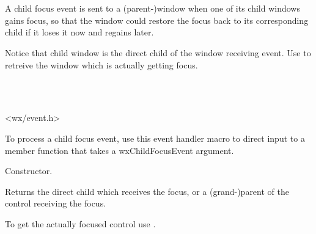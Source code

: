 \section{}\label{wxchildfocusevent}

A child focus event is sent to a (parent-)window when one of its child windows gains focus,
so that the window could restore the focus back to its corresponding child
if it loses it now and regains later.

Notice that child window is the direct child of the window receiving event.
Use  to retreive the window which is actually getting focus. 


\\
\\


<wx/event.h>




To process a child focus event, use this event handler macro to direct input to a member
function that takes a wxChildFocusEvent argument.

\twocolwidtha{7cm}
\begin{twocollist}\itemsep=0pt
\end{twocollist}%





\label{wxchildfocuseventctor}


Constructor.




\label{wxchildfocuseventgetwindow}

Returns the direct child which receives the focus, or a (grand-)parent of the control receiving the focus.

To get the actually focused control use .

